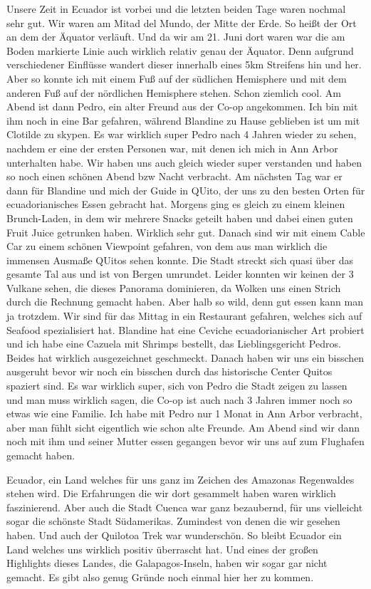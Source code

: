 \documentclass[11pt]{book}
\begin{document}
Unsere Zeit in Ecuador ist vorbei und die letzten beiden Tage waren nochmal sehr gut. Wir waren am Mitad del Mundo, der Mitte der Erde. So heißt der 
Ort an dem der Äquator verläuft. Und da wir am 21. Juni dort waren war die am Boden markierte Linie auch wirklich relativ genau der Äquator. Denn 
aufgrund verschiedener Einflüsse wandert dieser innerhalb eines 5km Streifens hin und her. Aber so konnte ich mit einem Fuß auf der südlichen Hemisphere 
und mit dem anderen Fuß auf der nördlichen Hemisphere stehen. Schon ziemlich cool. 
Am Abend ist dann Pedro, ein alter Freund aus der Co-op angekommen. Ich bin mit ihm noch in eine Bar gefahren, während Blandine zu Hause geblieben ist 
um mit Clotilde zu skypen. Es war wirklich super Pedro nach 4 Jahren wieder zu sehen, nachdem er eine der ersten Personen war, mit denen ich mich in Ann Arbor 
unterhalten habe. Wir haben uns auch gleich wieder super verstanden und haben so noch einen schönen Abend bzw Nacht verbracht. Am nächsten Tag war er 
dann für Blandine und mich der Guide in QUito, der uns zu den besten Orten für ecuadorianisches Essen gebracht hat. Morgens ging es gleich zu einem 
kleinen Brunch-Laden, in dem wir mehrere Snacks geteilt haben und dabei einen guten Fruit Juice getrunken haben. Wirklich sehr gut. Danach sind wir mit 
einem Cable Car zu einem schönen Viewpoint gefahren, von dem aus man wirklich die immensen Ausmaße QUitos sehen konnte. Die Stadt streckt sich quasi über 
das gesamte Tal aus und ist von Bergen umrundet. Leider konnten wir keinen der 3 Vulkane sehen, die dieses Panorama dominieren, da Wolken uns einen 
Strich durch die Rechnung gemacht haben. Aber halb so wild, denn gut essen kann man ja trotzdem. Wir sind für das Mittag in ein Restaurant gefahren, welches 
sich auf Seafood spezialisiert hat. Blandine hat eine Ceviche ecuadorianischer Art probiert und ich habe eine Cazuela mit Shrimps bestellt, das Lieblingsgericht 
Pedros. Beides hat wirklich ausgezeichnet geschmeckt. Danach haben wir uns ein bisschen ausgeruht bevor wir noch ein bisschen durch das historische Center Quitos 
spaziert sind. Es war wirklich super, sich von Pedro die Stadt zeigen zu lassen und man muss wirklich sagen, die Co-op ist auch nach 3 Jahren immer noch 
so etwas wie eine Familie. Ich habe mit Pedro nur 1 Monat in Ann Arbor verbracht, aber man fühlt sicht eigentlich wie schon alte Freunde. 
Am Abend sind wir dann noch mit ihm und seiner Mutter essen gegangen bevor wir uns auf zum Flughafen gemacht haben. 



Ecuador, ein Land welches für uns ganz im Zeichen des Amazonas Regenwaldes stehen wird. Die Erfahrungen die wir dort gesammelt haben waren wirklich 
faszinierend. Aber auch die Stadt Cuenca war ganz bezaubernd, für uns vielleicht sogar die schönste Stadt Südamerikas. Zumindest von denen die wir gesehen 
haben. Und auch der Quilotoa Trek war wunderschön. So bleibt Ecuador ein Land welches uns wirklich positiv überrascht hat. Und eines der großen Highlights 
dieses Landes, die Galapagos-Inseln, haben wir sogar gar nicht gemacht. Es gibt also genug Gründe noch einmal hier her zu kommen.
\end{document}
